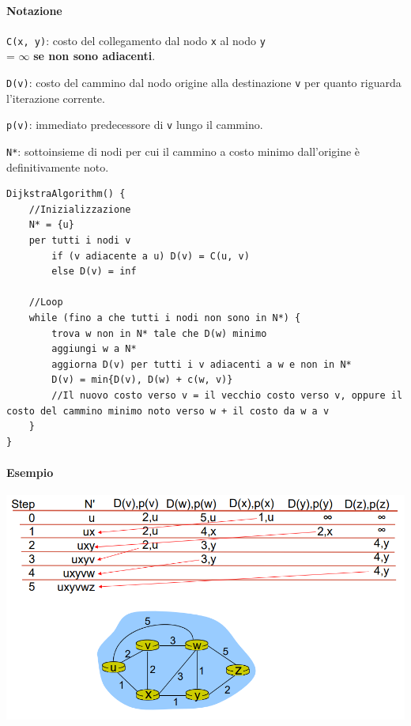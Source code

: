\documentclass[10pt]{article}
\begin{document}
\paragraph{Notazione}
\begin{list}{}{}
	\item \texttt{C(x, y)}: costo del collegamento dal nodo \texttt{x} al nodo \texttt{y}\\
	= $\infty$ \textbf{se non sono adiacenti}.
	\item \texttt{D(v)}: costo del cammino dal nodo origine alla destinazione \texttt{v} per quanto riguarda l'iterazione corrente.
	\item \texttt{p(v)}: immediato predecessore di \texttt{v} lungo il cammino.
	\item \texttt{N*}: sottoinsieme di nodi per cui il cammino a costo minimo dall'origine è definitivamente noto.
\end{list}
\pagebreak
\begin{lstlisting}
DijkstraAlgorithm() {
	//Inizializzazione
	N* = {u}
	per tutti i nodi v
		if (v adiacente a u) D(v) = C(u, v)
		else D(v) = inf
	
	//Loop
	while (fino a che tutti i nodi non sono in N*) {
		trova w non in N* tale che D(w) minimo
		aggiungi w a N*
		aggiorna D(v) per tutti i v adiacenti a w e non in N*
		D(v) = min{D(v), D(w) + c(w, v)}
		//Il nuovo costo verso v = il vecchio costo verso v, oppure il costo del cammino minimo noto verso w + il costo da w a v
	}
}
\end{lstlisting}
\paragraph{Esempio}
\begin{center}
	\includegraphics[scale=0.7]{dijkstraexample.png}
\end{center}
\pagebreak
\end{document}
